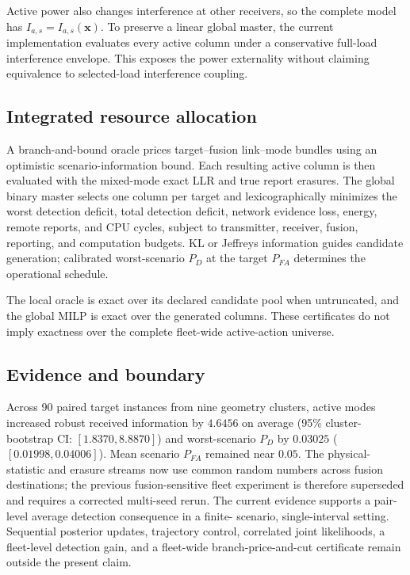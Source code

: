 Active power also changes interference at other receivers, so the complete
model has $I_{a,s}=I_{a,s}(\mathbf{x})$. To preserve a linear global master,
the current implementation evaluates every active column under a conservative
full-load interference envelope. This exposes the power externality without
claiming equivalence to selected-load interference coupling.

\subsection{Integrated resource allocation}

A branch-and-bound oracle prices target--fusion link--mode bundles using an
optimistic scenario-information bound. Each resulting active column is then
evaluated with the mixed-mode exact LLR and true report erasures. The global
binary master selects one column per target and lexicographically minimizes
the worst detection deficit, total detection deficit, network evidence loss,
energy, remote reports, and CPU cycles, subject to transmitter, receiver, fusion, reporting, and
computation budgets. KL or Jeffreys information guides candidate generation;
calibrated worst-scenario $P_D$ at the target $P_{FA}$ determines the
operational schedule.

The local oracle is exact over its declared candidate pool when untruncated,
and the global MILP is exact over the generated columns. These certificates do
not imply exactness over the complete fleet-wide active-action universe.

\subsection{Evidence and boundary}

Across 90 paired target instances from nine geometry clusters, active modes
increased robust received information by $4.6456$ on average (95\% cluster-
bootstrap CI: $[1.8370,8.8870]$) and worst-scenario $P_D$ by $0.03025$
($[0.01998,0.04006]$). Mean scenario $P_{FA}$ remained near $0.05$. The
physical-statistic and erasure streams now use common random numbers across
fusion destinations; the previous fusion-sensitive fleet experiment is
therefore superseded and requires a corrected multi-seed rerun. The current
evidence supports a pair-level average detection consequence in a finite-
scenario, single-interval setting. Sequential posterior updates, trajectory
control, correlated joint likelihoods, a fleet-level detection gain, and a
fleet-wide branch-price-and-cut certificate remain outside the present claim.
